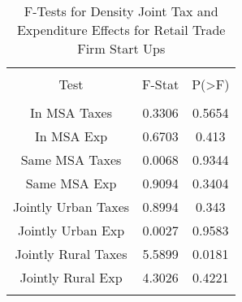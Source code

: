 
\begin{table}[!htbp] \centering 
  \caption{F-Tests for Density Joint Tax and Expenditure Effects for Retail Trade Firm Start Ups} 
  \label{44-45Ftests} 
\begin{tabular}{@{\extracolsep{5pt}} ccc} 
\\[-1.8ex]\hline 
\hline \\[-1.8ex] 
Test & F-Stat & P(\textgreater F) \\ 
\hline \\[-1.8ex] 
In MSA Taxes & 0.3306 & 0.5654 \\ 
In MSA Exp & 0.6703 & 0.413 \\ 
Same MSA Taxes & 0.0068 & 0.9344 \\ 
Same MSA Exp & 0.9094 & 0.3404 \\ 
Jointly Urban Taxes & 0.8994 & 0.343 \\ 
Jointly Urban Exp & 0.0027 & 0.9583 \\ 
Jointly Rural Taxes & 5.5899 & 0.0181 \\ 
Jointly Rural Exp & 4.3026 & 0.4221 \\ 
\hline \\[-1.8ex] 
\end{tabular} 
\end{table} 
